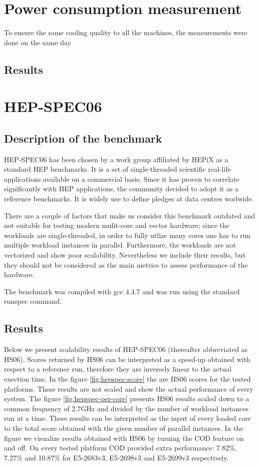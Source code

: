 \documentclass[a4paper]{jpconf}
\begin{document}
\section{Power consumption measurement}
To ensure the same cooling quality to all the machines, the measurements were done on the same day
\subsection{Results}


\section{HEP-SPEC06}
\subsection{Description of the benchmark}
HEP-SPEC06 has been chosen by a work group affiliated by HEPiX as a standard HEP benchmarks. It is a set of single-threaded scientific real-life applications available on a commercial basis. Since it has proven to correlate significantly with HEP applications, the community decided to adopt it as a reference benchmarks. It is widely use to define pledges at data centres worlwide.

There are a couple of factors that make us consider this benchmark outdated and not suitable for testing modern mulit-core and vector hardware; since the workloads are single-threaded, in order to fully utlize many cores one has to run multiple workload instances in parallel. Furthermore, the workloads are not vectorized and show poor scalability. Nevertheless we include their results, but they should not be considered as the main metrics to assess performance of the hardware.

The benchmark was compiled with gcc 4.4.7 and was run using the standard runspec command.
\subsection{Results}
Below we present scalability results of HEP-SPEC06 (thereafter abbreviated as HS06). Scores returned by HS06 can be interpreted as a speed-up obtained with respect to a reference run, therefore they are inversely linear to the actual exection time.
In the figure \ref{fig:hepspec-score} the are HS06 scores for the tested platforms. These results are not scaled and show the actual performance of every system.
The figure \ref{fig:hepspec-per-core} presents HS06 results scaled down to a common frequency of 2.7GHz and divided by the number of workload instances run at a time. These results can be interpreted as the input of every loaded core to the total score obtained with the given number of parallel instances.
In the figure we visualize results obtained with HS06 by turning the COD feature on and off. On every tested platform COD provided extra performance: 7.82\%, 7.27\% and 10.87\% for E5-2683v3, E5-2698v3 and E5-2699v3 respectively.
\end{document}
